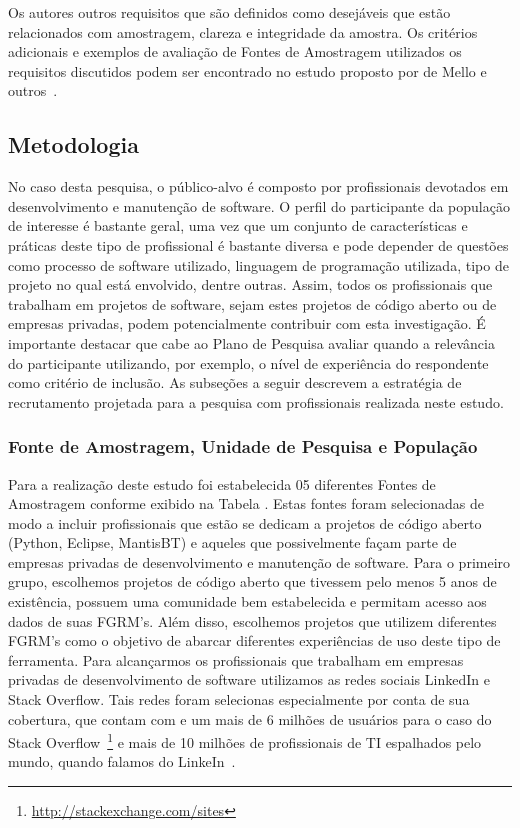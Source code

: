 Os autores outros requisitos que são definidos como desejáveis que estão
relacionados com amostragem, clareza e integridade da amostra. Os critérios
adicionais e exemplos de avaliação de Fontes de Amostragem utilizados os
requisitos discutidos podem ser encontrado no estudo proposto por de Mello e
outros~\cite{de2014towards}.

\subsection{Metodologia}

No caso desta pesquisa, o público-alvo é composto por profissionais devotados em
desenvolvimento e manutenção de software. O perfil do participante da população
de interesse é bastante geral, uma vez que um conjunto de características e
práticas deste tipo de profissional é bastante diversa e pode depender de
questões como processo de software utilizado, linguagem de programação
utilizada, tipo de projeto no qual está envolvido, dentre outras. Assim, todos
os profissionais que trabalham em projetos de software, sejam estes projetos de
código aberto ou de empresas privadas, podem potencialmente contribuir com esta
investigação. É importante destacar que cabe ao Plano de Pesquisa avaliar quando
a relevância do participante utilizando, por exemplo, o nível de experiência do
respondente como critério de inclusão. As subseções a seguir descrevem a
estratégia de recrutamento projetada para a pesquisa com profissionais
realizada neste estudo.

\subsubsection{Fonte de Amostragem, Unidade de Pesquisa e População}

Para a realização deste estudo foi estabelecida 05 diferentes Fontes de
Amostragem conforme exibido na Tabela . Estas fontes foram selecionadas de modo
a incluir profissionais que estão se dedicam a projetos de código aberto
(Python, Eclipse, MantisBT) e aqueles que possivelmente façam parte de empresas
privadas de desenvolvimento e manutenção de software. Para o primeiro grupo,
escolhemos projetos de código aberto que tivessem pelo menos 5 anos de
existência, possuem uma comunidade bem estabelecida e permitam acesso aos dados
de suas FGRM's. Além disso, escolhemos projetos que utilizem diferentes FGRM's
como o objetivo de abarcar diferentes experiências de uso deste tipo de
ferramenta. Para alcançarmos os profissionais que trabalham em empresas privadas
de desenvolvimento de software utilizamos  as redes sociais LinkedIn e Stack
Overflow. Tais redes foram selecionas especialmente por conta de sua cobertura,
que contam com e um mais de 6 milhões de usuários para o caso do Stack
Overflow~\footnote{\url{http://stackexchange.com/sites}} e mais de 10 milhões
de profissionais de TI espalhados pelo mundo, quando falamos do
LinkeIn~\cite{de2014towards}.

